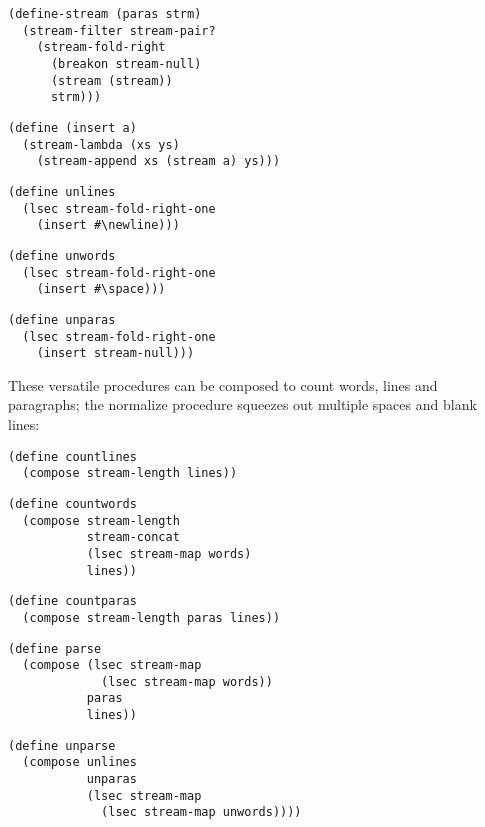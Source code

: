 \begin{verbatim}
(define-stream (paras strm)
  (stream-filter stream-pair?
    (stream-fold-right
      (breakon stream-null)
      (stream (stream))
      strm)))
\end{verbatim}

\begin{verbatim}
(define (insert a)
  (stream-lambda (xs ys)
    (stream-append xs (stream a) ys)))
\end{verbatim}

\begin{verbatim}
(define unlines
  (lsec stream-fold-right-one
    (insert #\newline)))
\end{verbatim}

\begin{verbatim}
(define unwords
  (lsec stream-fold-right-one
    (insert #\space)))
\end{verbatim}

\begin{verbatim}
(define unparas
  (lsec stream-fold-right-one
    (insert stream-null)))
\end{verbatim}

These versatile procedures can be composed to count words, lines and
paragraphs; the normalize procedure squeezes out multiple spaces and
blank lines:

\begin{verbatim}
(define countlines
  (compose stream-length lines))
\end{verbatim}

\begin{verbatim}
(define countwords
  (compose stream-length
           stream-concat
           (lsec stream-map words)
           lines))
\end{verbatim}

\begin{verbatim}
(define countparas
  (compose stream-length paras lines))
\end{verbatim}

\begin{verbatim}
(define parse
  (compose (lsec stream-map
             (lsec stream-map words))
           paras
           lines))
\end{verbatim}

\begin{verbatim}
(define unparse
  (compose unlines
           unparas
           (lsec stream-map
             (lsec stream-map unwords))))
\end{verbatim}

